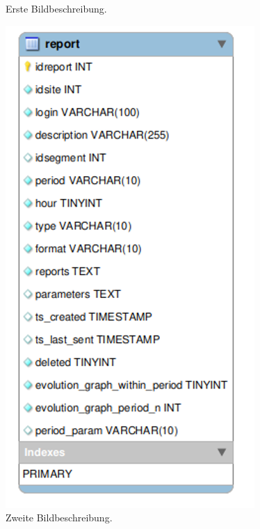 \begin{figure}[H]
\begin{minipage}{0.48\textwidth}
        \captionsetup{skip=5pt}
        \caption{Erste Bildbeschreibung.}
        \label{fig:site}
    \end{minipage}
    \hfill
    \begin{minipage}{0.48\textwidth}
        \centering
        \includegraphics[width=\textwidth]{images/report.png}
        \captionsetup{skip=-1pt}
        \caption{Zweite Bildbeschreibung.}
        \label{fig:report}
    \end{minipage}
\end{figure}


